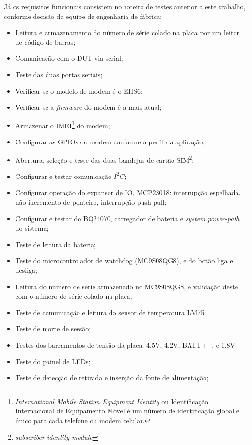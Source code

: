         Já os requisitos funcionais consistem no roteiro de testes anterior a este trabalho, conforme decisão da equipe de engenharia de fábrica:
        \begin{itemize}
            \item Leitura e armazenamento do número de série colado na placa por um leitor de código de barras;
            \item Comunicação com o DUT via serial;
            \item Teste das duas portas seriais;
            \item Verificar se o modelo de modem é o EHS6;
            \item Verificar se a \textit{firmware} do modem é a mais atual;
            \item Armazenar o IMEI\footnote{\textit{International Mobile Station Equipment Identity} ou Identificação Internacional de Equipamento Móvel é um número de identificação global e único para cada telefone ou modem celular.} do modem;
            \item Configurar as GPIOs do modem conforme o perfil da aplicação;
            \item Abertura, seleção e teste das duas bandejas de cartão SIM\footnote{\textit{subscriber identity module}};
            \item Configurar e testar comunicação $I^{2}C$;
            \item Configurar operação do expansor de IO, MCP23018: interrupção espelhada, não incremento de ponteiro, interrupção push-pull;
            \item Configurar e testar do BQ24070, carregador de bateria e \textit{system power-path} do sistema;
            \item Teste de leitura da bateria;
            \item Teste do microcontrolador de watchdog (MC9S08QG8), e do botão liga e desliga;
            \item Leitura do número de série armazenado no MC9S08QG8, e validação deste com o número de série colado  na placa;
            \item Teste de comunicação e leitura do sensor de temperatura LM75
            \item Teste de morte de sessão;
            \item Testes dos barramentos de tensão da placa: 4.5V, 4.2V, BATT++, e 1.8V;
            \item Teste do painel de LEDs;
            \item Teste de detecção de retirada e inserção da fonte de alimentação;

\end{itemize}
